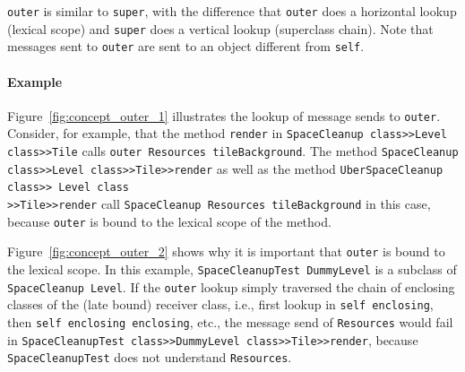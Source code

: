 \texttt{outer} is similar to \texttt{super}, with the difference that \texttt{outer} does a horizontal lookup (lexical scope) and \texttt{super} does a vertical lookup (superclass chain). Note that messages sent to \texttt{outer} are sent to an object different from \texttt{self}.

\paragraph{Example}
Figure~\ref{fig:concept_outer_1} illustrates the lookup of message sends to \texttt{outer}. Consider, for example, that the method \texttt{render} in \texttt{SpaceCleanup class>>Level class>>Tile} calls \texttt{outer Resources tileBackground}. The method \texttt{SpaceCleanup class>>Level class>>Tile>>render} as well as the method \texttt{UberSpaceCleanup class>> Level class\\>>Tile>>render} call \texttt{SpaceCleanup Resources tileBackground} in this case, because \texttt{outer} is bound to the lexical scope of the method.

Figure~\ref{fig:concept_outer_2} shows why it is important that \texttt{outer} is bound to the lexical scope. In this example, \texttt{SpaceCleanupTest DummyLevel} is a subclass of \texttt{SpaceCleanup Level}. If the \texttt{outer} lookup simply traversed the chain of enclosing classes of the (late bound) receiver class, i.e., first lookup in \texttt{self enclosing}, then \texttt{self enclosing enclosing}, etc., the message send of \texttt{Resources} would fail in \texttt{SpaceCleanupTest class>>DummyLevel class>>Tile>>render}, because \texttt{SpaceCleanupTest} does not understand \texttt{Resources}.

